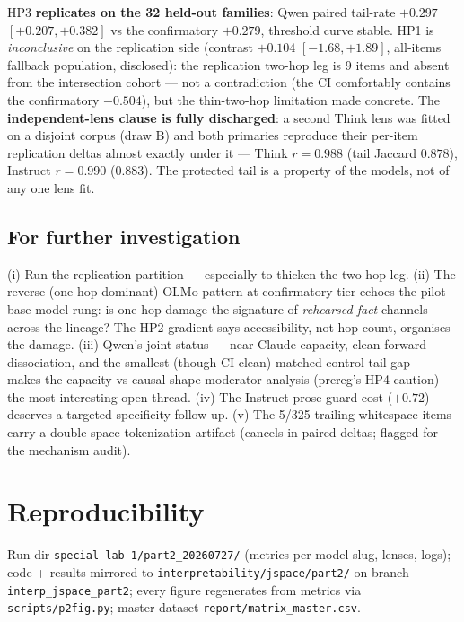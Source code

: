 \documentclass[10pt]{article}
\newcommand{\code}[1]{\texttt{\small #1}}
\begin{document}
HP3 \textbf{replicates on the 32 held-out families}: Qwen paired
tail-rate $+0.297$ $[+0.207, +0.382]$ vs the confirmatory $+0.279$,
threshold curve stable. HP1 is \emph{inconclusive} on the replication
side (contrast $+0.104$ $[-1.68, +1.89]$, all-items fallback population,
disclosed): the replication two-hop leg is 9 items and absent from the
intersection cohort --- not a contradiction (the CI comfortably contains
the confirmatory $-0.504$), but the thin-two-hop limitation made
concrete. The \textbf{independent-lens clause is fully discharged}: a
second Think lens was fitted on a disjoint corpus (draw B) and both
primaries reproduce their per-item replication deltas almost exactly
under it --- Think $r=0.988$ (tail Jaccard $0.878$), Instruct $r=0.990$
($0.883$). The protected tail is a property of the models, not of any
one lens fit.

\subsection{For further investigation}

(i) Run the replication partition --- especially to thicken the two-hop
leg. (ii) The reverse (one-hop-dominant) OLMo pattern at confirmatory
tier echoes the pilot base-model rung: is one-hop damage the signature
of \emph{rehearsed-fact} channels across the lineage? The HP2 gradient
says accessibility, not hop count, organises the damage. (iii) Qwen's
joint status --- near-Claude capacity, clean forward dissociation, and
the smallest (though CI-clean) matched-control tail gap --- makes the
capacity-vs-causal-shape moderator analysis (prereg's HP4 caution) the
most interesting open thread. (iv) The Instruct prose-guard cost
($+0.72$) deserves a targeted specificity follow-up. (v) The 5/325
trailing-whitespace items carry a double-space tokenization artifact
(cancels in paired deltas; flagged for the mechanism audit).

\section*{Reproducibility}

Run dir \code{special-lab-1/part2\_20260727/} (metrics per model slug,
lenses, logs); code + results mirrored to
\code{interpretability/jspace/part2/} on branch \code{interp\_jspace\_part2};
every figure regenerates from metrics via \code{scripts/p2fig.py}; master
dataset \code{report/matrix\_master.csv}.
\end{document}
